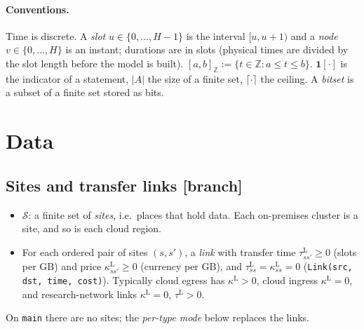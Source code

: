 \documentclass[11pt,a4paper]{article}
\theoremstyle{definition}
\theoremstyle{remark}
\newcommand{\Sites}{\mathcal{S}}
\newcommand{\Z}{\mathbb{Z}}
\newcommand{\code}[1]{\texttt{#1}}
\newcommand{\ind}[1]{\mathbf{1}[#1]}
\newcommand{\status}[1]{\textsf{\small[#1]}}
\begin{document}
\paragraph{Conventions.} Time is discrete. A \emph{slot} $u\in\{0,\dots,H-1\}$
is the interval $[u,u+1)$ and a \emph{node} $v\in\{0,\dots,H\}$ is an instant;
durations are in slots (physical times are divided by the slot length before
the model is built). $[a,b]_\Z:=\{t\in\Z:a\le t\le b\}$. $\ind{\cdot}$ is the
indicator of a statement, $|A|$ the size of a finite set, $\lceil\cdot\rceil$
the ceiling. A \emph{bitset} is a subset of a finite set stored as bits.

\section{Data}\label{sec:data}

\subsection{Sites and transfer links \status{branch}}
\begin{itemize}[leftmargin=*]
\item $\Sites$: a finite set of \emph{sites}, i.e.\ places that hold data. Each
  on-premises cluster is a site, and so is each cloud region.
\item For each ordered pair of sites $(s,s')$, a \emph{link} with transfer time
  $\tau^{\mathrm L}_{ss'}\ge0$ (slots per GB) and price
  $\kappa^{\mathrm L}_{ss'}\ge0$ (currency per GB), and
  $\tau^{\mathrm L}_{ss}=\kappa^{\mathrm L}_{ss}=0$ (\code{Link(src, dst, time, cost)}).
  Typically cloud egress has $\kappa^{\mathrm L}>0$, cloud ingress
  $\kappa^{\mathrm L}=0$, and research-network links $\kappa^{\mathrm L}=0$,
  $\tau^{\mathrm L}>0$.
\end{itemize}
On \code{main} there are no sites; the \emph{per-type mode} below replaces the
links.
\end{document}
